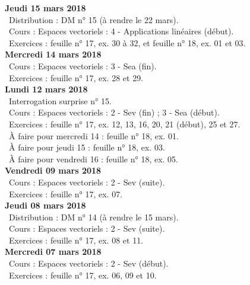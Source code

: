 \documentclass[12pt,a4paper]{article}
\begin{document}
\noindent\textbf{Jeudi 15 mars 2018}\\
\bu\ Distribution : DM n° 15 (à rendre le 22 mars).\\
\bu\ Cours : Espaces vectoriels : 4 - Applications linéaires (début).\\
\bu\ Exercices : feuille n° 17, ex. 30 à 32, et feuille n° 18, ex. 01 et 03.\vspace{.4cm}\\

\noindent\textbf{Mercredi 14 mars 2018} \\
\bu\ Cours : Espaces vectoriels : 3 - Sea (fin).\\
\bu\ Exercices : feuille n° 17, ex. 28 et 29.\vspace{.4cm}\\

\noindent\textbf{\bf Lundi 12 mars 2018} \\
\bu\ Interrogation surprise n° 15.\\
\bu\ Cours : Espaces vectoriels : 2 - Sev (fin) ; 3 - Sea (début).\\
\bu\ Exercices : feuille n° 17, ex. 12, 13, 16, 20, 21 (début), 25 et 27.\\
\bu\ À faire pour mercredi 14 : feuille n° 18, ex. 01.\\
\bu\ À faire pour jeudi 15 : feuille n° 18, ex. 03.\\
\bu\ À faire pour vendredi 16 : feuille n° 18, ex. 05.\vspace{.4cm}\\

\noindent\textbf{Vendredi 09 mars 2018}\\
\bu\ Cours : Espaces vectoriels : 2 - Sev (suite).\\
\bu\ Exercices : feuille n° 17, ex. 07.\vspace{.4cm}\\

\noindent\textbf{Jeudi 08 mars 2018}\\
\bu\ Distribution : DM n° 14 (à rendre le 15 mars).\\
\bu\ Cours : Espaces vectoriels : 2 - Sev (suite).\\
\bu\ Exercices : feuille n° 17, ex. 08 et 11.\vspace{.4cm}\\

\noindent\textbf{Mercredi 07 mars 2018} \\
\bu\ Cours : Espaces vectoriels : 2 - Sev (début).\\
\bu\ Exercices : feuille n° 17, ex. 06, 09 et 10.\vspace{.4cm}\\
\end{document}
